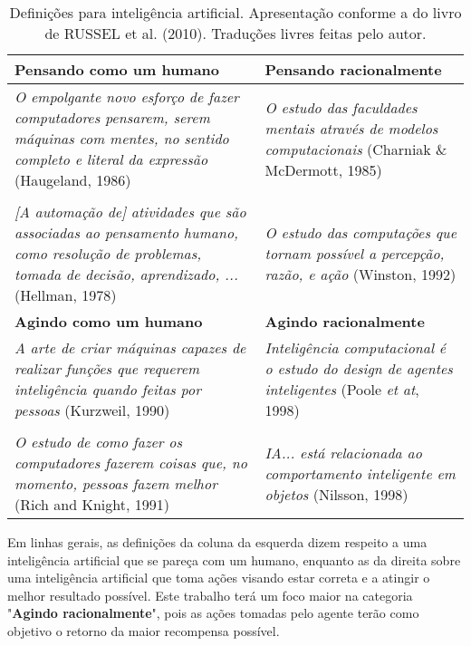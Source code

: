 \begin{table}
\centering
\begin{tabular}{| p{7cm} | p{7cm} |}
  \hline
  \textbf{Pensando como um humano} & \textbf{Pensando racionalmente} \\ \hline
  \textit{O empolgante novo esforço de fazer computadores pensarem, serem máquinas com mentes, no sentido completo e literal da expressão} \newline (Haugeland, 1986) & \textit{O estudo das faculdades mentais através de modelos computacionais} \newline (Charniak \& McDermott, 1985) \\ & \\ \textit{[A automação de] atividades que são associadas ao pensamento humano, como resolução de problemas, tomada de decisão, aprendizado, ...} \newline (Hellman, 1978) & \textit{O estudo das computações que tornam possível a percepção, razão, e ação} \newline (Winston, 1992) \\ \hline
  \textbf{Agindo como um humano} & \textbf{Agindo racionalmente} \\ \hline
  \textit{A arte de criar máquinas capazes de realizar funções que requerem inteligência quando feitas por pessoas} \newline (Kurzweil, 1990) & \textit{Inteligência computacional é o estudo do design de agentes inteligentes} \newline (Poole \textit{et at}, 1998) \\ & \\ \textit{O estudo de como fazer os computadores fazerem coisas que, no momento, pessoas fazem melhor} \newline (Rich and Knight, 1991) & \textit{IA... está relacionada ao comportamento inteligente em objetos} \newline (Nilsson, 1998) \\ \hline
\end{tabular}
\caption{Definições para inteligência artificial. Apresentação conforme a do livro de RUSSEL et al. (2010). Traduções livres feitas pelo autor.}
\label{table:1}
\end{table}

Em linhas gerais, as definições da coluna da esquerda dizem respeito a uma inteligência artificial que se pareça com um humano, enquanto as da direita sobre uma inteligência artificial que toma ações visando estar correta e a atingir o melhor resultado possível. Este trabalho terá um foco maior na categoria "\textbf{Agindo racionalmente}", pois as ações tomadas pelo agente terão como objetivo o retorno da maior recompensa possível.

